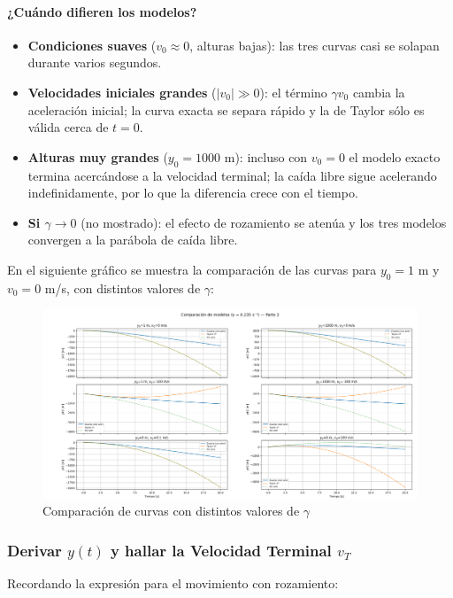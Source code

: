 \documentclass{article}
\begin{document}
\paragraph{¿Cuándo difieren los modelos?}
\begin{itemize}
    \item \textbf{Condiciones suaves} ($v_0 \approx 0$, alturas bajas): las tres curvas casi se solapan durante varios segundos.
    \item \textbf{Velocidades iniciales grandes} ($|v_0| \gg 0$): el término $\gamma v_0$ cambia la aceleración inicial; la curva exacta se separa rápido y la de Taylor sólo es válida cerca de $t=0$.
    \item \textbf{Alturas muy grandes} ($y_0=1000$ m): incluso con $v_0=0$ el modelo exacto termina acercándose a la velocidad terminal; la caída libre sigue acelerando indefinidamente, por lo que la diferencia crece con el tiempo.
    \item \textbf{Si $\gamma \to 0$} (no mostrado): el efecto de rozamiento se atenúa y los tres modelos convergen a la parábola de caída libre.
\end{itemize}

En el siguiente gráfico se muestra la comparación de las curvas para $y_0 = 1$ m y $v_0 = 0$ m/s, con distintos valores de $\gamma$:
\begin{figure}[H]
    \centering
    \includegraphics[width=1\textwidth]{assets/comparacion_de_los_modelos_p2.png}
    \caption{Comparación de curvas con distintos valores de $\gamma$}
\end{figure}

\subsubsection{Derivar $y(t)$ y hallar la Velocidad Terminal $v_T$}

Recordando la expresión para el movimiento con rozamiento:
\end{document}
